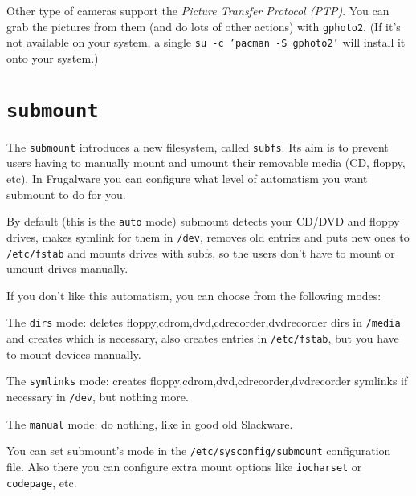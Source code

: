 Other type of cameras support the \textit{Picture Transfer Protocol (PTP)}. You can grab the pictures from them (and do lots of other actions) with {\tt gphoto2}. (If it's not available on your system, a single {\tt su -c 'pacman -S gphoto2'} will install it onto your system.)

\section{{\tt submount}}

The {\tt submount} introduces a new filesystem, called {\tt subfs}. Its aim is to prevent users having to manually mount and umount their removable media (CD, floppy, etc). In Frugalware you can configure what level of automatism you want submount to do for you. 

By default (this is the {\tt auto} mode) submount detects your CD/DVD and floppy drives, makes symlink for them in {\tt /dev}, removes old entries and puts new ones to {\tt /etc/fstab} and mounts drives with subfs, so the users don't have to mount or umount drives manually.

If you don't like this automatism, you can choose from the following modes:

The {\tt dirs} mode: deletes floppy,cdrom,dvd,cdrecorder,dvdrecorder dirs in {\tt /media} and creates which is necessary, also creates entries in {\tt /etc/fstab}, but you have to mount devices manually.

The {\tt symlinks} mode: creates floppy,cdrom,dvd,cdrecorder,dvdrecorder symlinks if necessary in {\tt /dev}, but nothing more.

The {\tt manual} mode: do nothing, like in good old Slackware.

You can set submount's mode in the {\tt /etc/sysconfig/submount} configuration file. Also there you can configure extra mount options like {\tt iocharset} or {\tt codepage}, etc.

